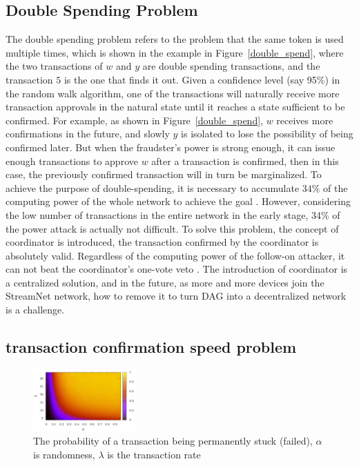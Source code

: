 \subsection{Double Spending Problem}
The double spending problem refers to the problem that the same token is used multiple times, which is shown in the example in Figure~\ref{double_spend}, 
where the two transactions of $w$ and $y$ are double spending transactions, and the transaction $5$ is the one that finds it out.
Given a confidence level (say 95\%) in the random walk algorithm, 
one of the transactions will naturally receive more transaction approvals in the natural state until it reaches a state sufficient to be confirmed.
For example, as shown in Figure~\ref{double_spend}, $w$ receives more confirmations in the future, and slowly $y$ is isolated to lose the possibility of being confirmed later. 
But when the fraudster's power is strong enough, it can issue enough transactions to approve $w$ after a transaction is confirmed, then in this case, the previously confirmed transaction will in turn be marginalized.
To achieve the purpose of double-spending, it is necessary to accumulate $34\%$ of the computing power of the whole network to achieve the goal \cite{popov2016tangle}. 
However, considering the low number of transactions in the entire network in the early stage, 34\% of the power attack is actually not difficult.
To solve this problem, the concept of coordinator is introduced, the transaction confirmed by the coordinator is absolutely valid.
Regardless of the computing power of the follow-on attacker, it can not beat the coordinator's one-vote veto . 
The introduction of coordinator is a centralized solution, and in the future, as more and more devices join the StreamNet network,
how to remove it to turn DAG into a decentralized network is a challenge.

\subsection{transaction confirmation speed problem}

\begin{figure}[!ht]
\begin{center}
	\includegraphics[width=0.35\textwidth]{figures/alpha.png}
        \caption{The probability of a transaction being permanently stuck (failed), $\alpha$ is randomness, $\lambda$ is the transaction rate \cite{iota_confirm}}
	\label{iota_confirm}
\end{center}
\end{figure}

